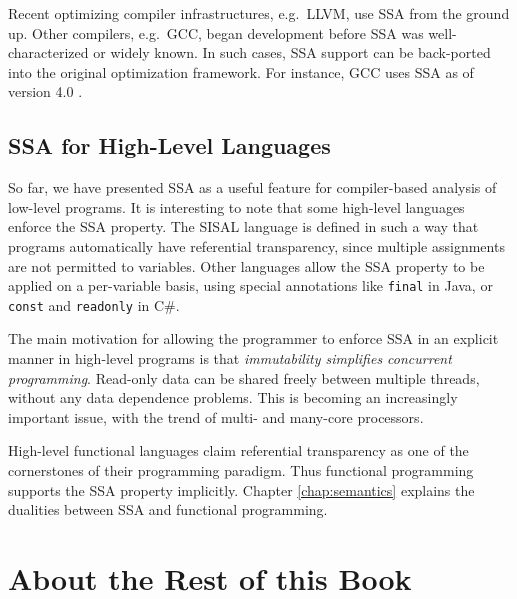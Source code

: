 Recent optimizing compiler infrastructures, e.g.\ LLVM, 
use SSA from the ground up.
Other compilers, e.g.\ GCC, began
development before SSA was well-characterized or
widely known.
In such cases, SSA support can be back-ported into 
the original optimization framework.
For instance, GCC uses SSA as of version 4.0
\cite{novillo03tree,novillo04design}.


\subsection{SSA for High-Level Languages}

So far, we have presented SSA as a useful feature for 
compiler-based analysis of low-level programs.
It is interesting to note that some high-level languages enforce
the SSA property.
The SISAL language is defined in such a way that
programs automatically have referential transparency, since
multiple assignments are not permitted to variables.
Other languages allow the SSA property to be
applied on a per-variable basis, using special annotations
like
\texttt{final} in Java, or 
\texttt{const} and \texttt{readonly} in C\#.

The main motivation for allowing the programmer to enforce
SSA in an explicit manner in high-level programs is that
\textit{immutability simplifies concurrent programming}.
Read-only data can be shared freely between multiple threads,
without any data dependence problems.
This is becoming an increasingly important issue, with the
trend of multi- and many-core processors.

High-level functional languages claim
referential transparency as one of the
cornerstones of their programming paradigm.
Thus functional programming supports the SSA property
implicitly.
Chapter \ref{chap:semantics} explains the 
dualities between SSA and functional programming.





\section{About the Rest of this Book}

